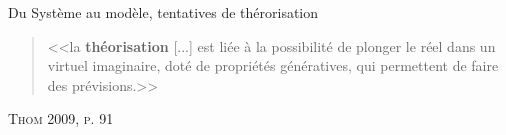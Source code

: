 \documentclass[newPxFont]{beamer}
\begin{document}
\begin{frame}[c]{Du Système au modèle, tentatives de thérorisation}
  \vspace{-1em}
  \begin{quote}
    <<la \textbf{théorisation} [...] est liée à la possibilité de plonger le réel dans un virtuel imaginaire, doté de propriétés génératives, qui permettent de faire des prévisions.>>
  \end{quote}
  \hspace*{\fill}\textsc{Thom 2009, p. 91}
  \vspace{-0.5em}
  \begin{figure}
   	\centering
   		\hspace{0.2em} %
      \hspace{0.2em} %
   		\hspace{0.2em} %
  \end{figure}
\end{frame}
\end{document}
